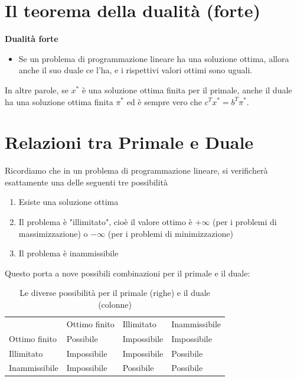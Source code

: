 \documentclass[a4paper, 11pt]{article}
\begin{document}
        \section*{Il teorema della dualità (forte)}
        \textbf{Dualità forte}
        \begin{itemize}
            \item Se un problema di programmazione lineare ha una soluzione ottima, allora anche il suo duale ce l'ha, e i rispettivi valori ottimi sono uguali.
        \end{itemize}
        In altre parole, se $x^*$ è una soluzione ottima finita per il primale, anche il duale ha una soluzione ottima finita $\pi^*$ ed è sempre vero che $c^T x^* = b^T \pi^*$.
        
        \section*{Relazioni tra Primale e Duale}
        Ricordiamo che in un problema di programmazione lineare, si verificherà esattamente una delle seguenti tre possibilità
        \begin{enumerate}
            \item Esiste una soluzione ottima
            \item Il problema è "illimitato", cioè il valore ottimo è $+\infty$ (per i problemi di massimizzazione) o $-\infty$ (per i problemi di minimizzazione)
            \item Il problema è inammissibile
        \end{enumerate}
        Questo porta a nove possibili combinazioni per il primale e il duale:
        \begin{table}[ht]
            \centering
            \begin{tabular}{llll}
                & Ottimo finito & Illimitato & Inammissibile \\
                Ottimo finito & Possibile & Impossibile & Impossibile \\
                Illimitato & Impossibile & Impossibile & Possibile \\
                Inammissibile & Impossibile & Possibile & Possibile \\
            \end{tabular}
            \caption{Le diverse possibilità per il primale (righe) e il duale (colonne)}
        \end{table}
        
\end{document}
